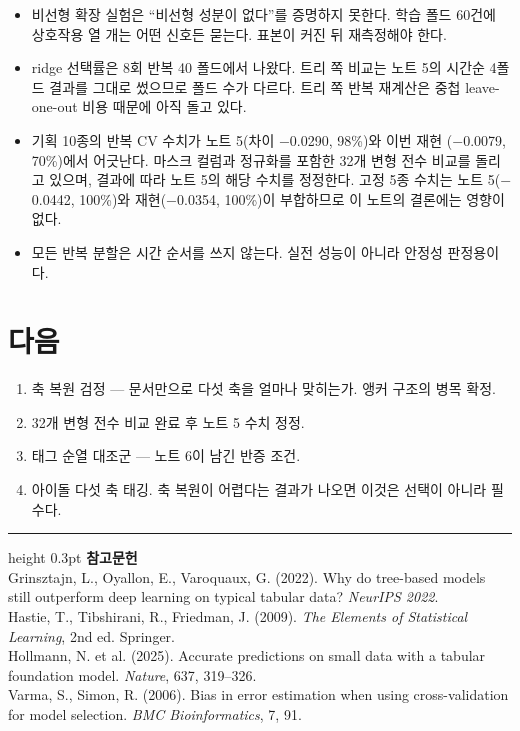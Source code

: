 \documentclass[10pt]{article}
\begin{document}
\begin{itemize}[leftmargin=1.1em,itemsep=0.15em]
\item 비선형 확장 실험은 ``비선형 성분이 없다''를 증명하지 못한다. 학습 폴드 60건에
      상호작용 열 개는 어떤 신호든 묻는다. 표본이 커진 뒤 재측정해야 한다.
\item ridge 선택률은 8회 반복 40 폴드에서 나왔다. 트리 쪽 비교는 노트 5의 시간순
      4폴드 결과를 그대로 썼으므로 폴드 수가 다르다. 트리 쪽 반복 재계산은 중첩
      leave-one-out 비용 때문에 아직 돌고 있다.
\item 기획 10종의 반복 CV 수치가 노트 5(차이 $-$0.0290, 98\%)와 이번 재현
      ($-$0.0079, 70\%)에서 어긋난다. 마스크 컬럼과 정규화를 포함한 32개 변형
      전수 비교를 돌리고 있으며, 결과에 따라 노트 5의 해당 수치를 정정한다.
      고정 5종 수치는 노트 5($-$0.0442, 100\%)와 재현($-$0.0354, 100\%)이
      부합하므로 이 노트의 결론에는 영향이 없다.
\item 모든 반복 분할은 시간 순서를 쓰지 않는다. 실전 성능이 아니라 안정성 판정용이다.
\end{itemize}

\section{다음}

\begin{enumerate}[leftmargin=1.3em,itemsep=0.15em]
\item 축 복원 검정 --- 문서만으로 다섯 축을 얼마나 맞히는가. 앵커 구조의 병목 확정.
\item 32개 변형 전수 비교 완료 후 노트 5 수치 정정.
\item 태그 순열 대조군 --- 노트 6이 남긴 반증 조건.
\item 아이돌 다섯 축 태깅. 축 복원이 어렵다는 결과가 나오면 이것은 선택이 아니라 필수다.
\end{enumerate}

\vspace{0.6em}
\hrule height 0.3pt
\vspace{0.5em}
{\footnotesize
\textbf{참고문헌}\\[0.3em]
Grinsztajn, L., Oyallon, E., Varoquaux, G. (2022). Why do tree-based models still
outperform deep learning on typical tabular data? \emph{NeurIPS 2022}.\\[0.15em]
Hastie, T., Tibshirani, R., Friedman, J. (2009). \emph{The Elements of Statistical
Learning}, 2nd ed. Springer.\\[0.15em]
Hollmann, N. et al. (2025). Accurate predictions on small data with a tabular
foundation model. \emph{Nature}, 637, 319--326.\\[0.15em]
Varma, S., Simon, R. (2006). Bias in error estimation when using cross-validation
for model selection. \emph{BMC Bioinformatics}, 7, 91.
}
\end{document}
